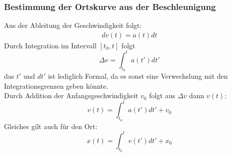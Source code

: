 \documentclass{article}
\begin{document}
\subsubsection{Bestimmung der Ortskurve aus der Beschleunigung}
Aus der Ableitung der Geschwindigkeit folgt:
\begin{align}
    dv(t)=a(t)dt
\end{align}
Durch Integration im Intervall $[t_0,t]$ folgt
\begin{equation}
    \Delta v=\int_{t_0}^{t} a(t')dt'
\end{equation}
das $t'$ und $dt'$ ist lediglich Formal, da es sonst eine Verwechslung mit den Integrationsgrenzen geben könnte.\\
Durch Addition der Anfangsgeschwindigkeit $v_0$ folgt aus $\Delta v$ dann $v(t)$:
\begin{equation}
    v(t)=\int_{t_0}^{t}a(t')dt' + v_0
\end{equation}
Gleiches gilt auch für den Ort:
\begin{equation}
    x(t)=\int_{t_0}^{t} v(t')dt' + x_0
\end{equation}
\end{document}
